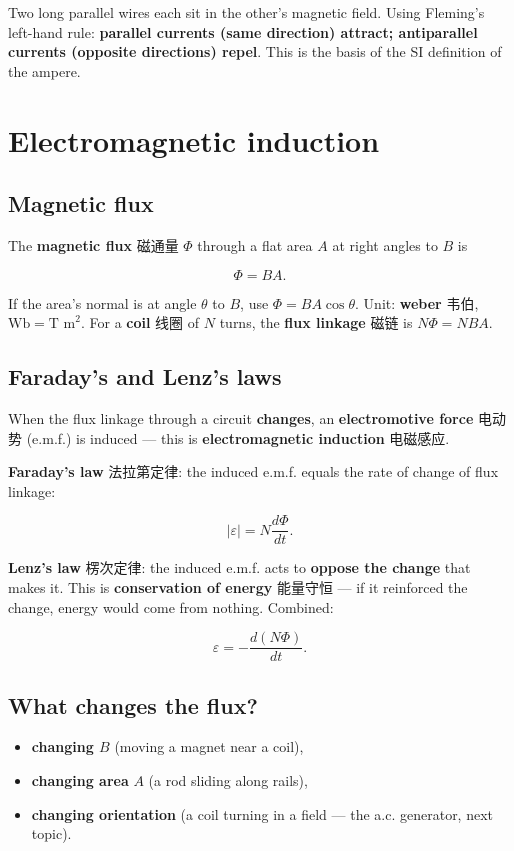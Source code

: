 \documentclass[11pt]{article}
\begin{document}
Two long parallel wires each sit in the other's magnetic field. Using Fleming's left-hand rule: \textbf{parallel currents (same direction) attract; antiparallel currents (opposite directions) repel}. This is the basis of the SI definition of the ampere.

\section*{Electromagnetic induction}

\subsection*{Magnetic flux}

The \textbf{magnetic flux} 磁通量 $\Phi$ through a flat area $A$ at right angles to $B$ is

\[
\Phi = B A.
\]

If the area's normal is at angle $\theta$ to $B$, use $\Phi = B A \cos\theta$. Unit: \textbf{weber} 韦伯, $\text{Wb} = \text{T m}^{2}$. For a \textbf{coil} 线圈 of $N$ turns, the \textbf{flux linkage} 磁链 is $N\Phi = N B A$.

\subsection*{Faraday's and Lenz's laws}

When the flux linkage through a circuit \textbf{changes}, an \textbf{electromotive force} 电动势 (e.m.f.) is induced — this is \textbf{electromagnetic induction} 电磁感应.

\textbf{Faraday's law} 法拉第定律: the induced e.m.f. equals the rate of change of flux linkage:

\[
|\varepsilon| = N\frac{d\Phi}{dt}.
\]

\textbf{Lenz's law} 楞次定律: the induced e.m.f. acts to \textbf{oppose the change} that makes it. This is \textbf{conservation of energy} 能量守恒 — if it reinforced the change, energy would come from nothing. Combined:

\[
\varepsilon = -\frac{d(N\Phi)}{dt}.
\]

\subsection*{What changes the flux?}

\begin{itemize}
\item \textbf{changing $B$} (moving a magnet near a coil),

\item \textbf{changing area} $A$ (a rod sliding along rails),

\item \textbf{changing orientation} (a coil turning in a field — the a.c. generator, next topic).

\end{itemize}
\end{document}
